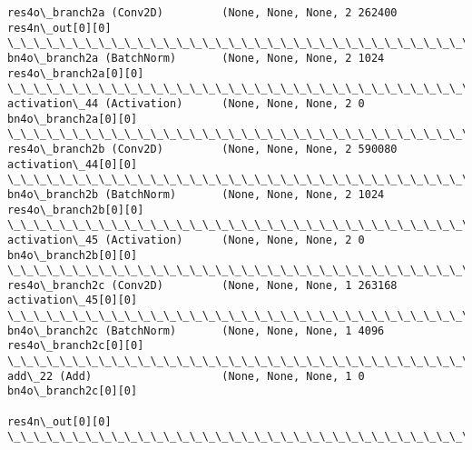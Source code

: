 \documentclass[11pt]{article}
\begin{document}
\begin{Verbatim}[commandchars=\\\{\}]
res4o\_branch2a (Conv2D)         (None, None, None, 2 262400      res4n\_out[0][0]                  
\_\_\_\_\_\_\_\_\_\_\_\_\_\_\_\_\_\_\_\_\_\_\_\_\_\_\_\_\_\_\_\_\_\_\_\_\_\_\_\_\_\_\_\_\_\_\_\_\_\_\_\_\_\_\_\_\_\_\_\_\_\_\_\_\_\_\_\_\_\_\_\_\_\_\_\_\_\_\_\_\_\_\_\_\_\_\_\_\_\_\_\_\_\_\_\_\_\_
bn4o\_branch2a (BatchNorm)       (None, None, None, 2 1024        res4o\_branch2a[0][0]             
\_\_\_\_\_\_\_\_\_\_\_\_\_\_\_\_\_\_\_\_\_\_\_\_\_\_\_\_\_\_\_\_\_\_\_\_\_\_\_\_\_\_\_\_\_\_\_\_\_\_\_\_\_\_\_\_\_\_\_\_\_\_\_\_\_\_\_\_\_\_\_\_\_\_\_\_\_\_\_\_\_\_\_\_\_\_\_\_\_\_\_\_\_\_\_\_\_\_
activation\_44 (Activation)      (None, None, None, 2 0           bn4o\_branch2a[0][0]              
\_\_\_\_\_\_\_\_\_\_\_\_\_\_\_\_\_\_\_\_\_\_\_\_\_\_\_\_\_\_\_\_\_\_\_\_\_\_\_\_\_\_\_\_\_\_\_\_\_\_\_\_\_\_\_\_\_\_\_\_\_\_\_\_\_\_\_\_\_\_\_\_\_\_\_\_\_\_\_\_\_\_\_\_\_\_\_\_\_\_\_\_\_\_\_\_\_\_
res4o\_branch2b (Conv2D)         (None, None, None, 2 590080      activation\_44[0][0]              
\_\_\_\_\_\_\_\_\_\_\_\_\_\_\_\_\_\_\_\_\_\_\_\_\_\_\_\_\_\_\_\_\_\_\_\_\_\_\_\_\_\_\_\_\_\_\_\_\_\_\_\_\_\_\_\_\_\_\_\_\_\_\_\_\_\_\_\_\_\_\_\_\_\_\_\_\_\_\_\_\_\_\_\_\_\_\_\_\_\_\_\_\_\_\_\_\_\_
bn4o\_branch2b (BatchNorm)       (None, None, None, 2 1024        res4o\_branch2b[0][0]             
\_\_\_\_\_\_\_\_\_\_\_\_\_\_\_\_\_\_\_\_\_\_\_\_\_\_\_\_\_\_\_\_\_\_\_\_\_\_\_\_\_\_\_\_\_\_\_\_\_\_\_\_\_\_\_\_\_\_\_\_\_\_\_\_\_\_\_\_\_\_\_\_\_\_\_\_\_\_\_\_\_\_\_\_\_\_\_\_\_\_\_\_\_\_\_\_\_\_
activation\_45 (Activation)      (None, None, None, 2 0           bn4o\_branch2b[0][0]              
\_\_\_\_\_\_\_\_\_\_\_\_\_\_\_\_\_\_\_\_\_\_\_\_\_\_\_\_\_\_\_\_\_\_\_\_\_\_\_\_\_\_\_\_\_\_\_\_\_\_\_\_\_\_\_\_\_\_\_\_\_\_\_\_\_\_\_\_\_\_\_\_\_\_\_\_\_\_\_\_\_\_\_\_\_\_\_\_\_\_\_\_\_\_\_\_\_\_
res4o\_branch2c (Conv2D)         (None, None, None, 1 263168      activation\_45[0][0]              
\_\_\_\_\_\_\_\_\_\_\_\_\_\_\_\_\_\_\_\_\_\_\_\_\_\_\_\_\_\_\_\_\_\_\_\_\_\_\_\_\_\_\_\_\_\_\_\_\_\_\_\_\_\_\_\_\_\_\_\_\_\_\_\_\_\_\_\_\_\_\_\_\_\_\_\_\_\_\_\_\_\_\_\_\_\_\_\_\_\_\_\_\_\_\_\_\_\_
bn4o\_branch2c (BatchNorm)       (None, None, None, 1 4096        res4o\_branch2c[0][0]             
\_\_\_\_\_\_\_\_\_\_\_\_\_\_\_\_\_\_\_\_\_\_\_\_\_\_\_\_\_\_\_\_\_\_\_\_\_\_\_\_\_\_\_\_\_\_\_\_\_\_\_\_\_\_\_\_\_\_\_\_\_\_\_\_\_\_\_\_\_\_\_\_\_\_\_\_\_\_\_\_\_\_\_\_\_\_\_\_\_\_\_\_\_\_\_\_\_\_
add\_22 (Add)                    (None, None, None, 1 0           bn4o\_branch2c[0][0]              
                                                                 res4n\_out[0][0]                  
\_\_\_\_\_\_\_\_\_\_\_\_\_\_\_\_\_\_\_\_\_\_\_\_\_\_\_\_\_\_\_\_\_\_\_\_\_\_\_\_\_\_\_\_\_\_\_\_\_\_\_\_\_\_\_\_\_\_\_\_\_\_\_\_\_\_\_\_\_\_\_\_\_\_\_\_\_\_\_\_\_\_\_\_\_\_\_\_\_\_\_\_\_\_\_\_\_\_

\end{Verbatim}
\end{document}
